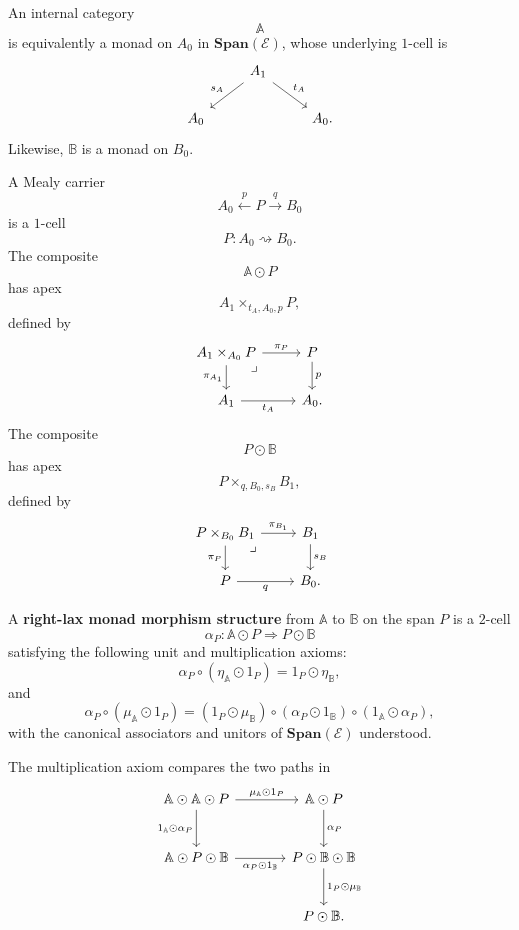 An internal category
\[
    \mathbb A
\]
is equivalently a monad on \(A_0\) in \(\mathbf{Span}(\mathcal E)\), whose
underlying \(1\)-cell is
\[
\begin{tikzcd}
    &
    A_1
        \arrow[dl, "s_A"']
        \arrow[dr, "t_A"]
    &
    \\
    A_0
    &&
    A_0.
\end{tikzcd}
\]
Likewise, \(\mathbb B\) is a monad on \(B_0\).

A Mealy carrier
\[
    A_0\xleftarrow{p}P\xrightarrow{q}B_0
\]
is a \(1\)-cell
\[
    P:A_0\rightsquigarrow B_0.
\]
The composite
\[
    \mathbb A\odot P
\]
has apex
\[
    A_1\times_{t_A,A_0,p}P,
\]
defined by
\[
\begin{tikzcd}
    A_1\times_{A_0}P
        \arrow[r, "\pi_P"]
        \arrow[d, "\pi_{A_1}"']
        \arrow[dr, phantom, "\lrcorner", very near start]
    &
    P
        \arrow[d, "p"]
    \\
    A_1
        \arrow[r, "t_A"']
    &
    A_0.
\end{tikzcd}
\]
The composite
\[
    P\odot\mathbb B
\]
has apex
\[
    P\times_{q,B_0,s_B}B_1,
\]
defined by
\[
\begin{tikzcd}
    P\times_{B_0}B_1
        \arrow[r, "\pi_{B_1}"]
        \arrow[d, "\pi_P"']
        \arrow[dr, phantom, "\lrcorner", very near start]
    &
    B_1
        \arrow[d, "s_B"]
    \\
    P
        \arrow[r, "q"']
    &
    B_0.
\end{tikzcd}
\]

\begin{definition}
\label{def:to-right-lax-monad-morphism}
    A \textbf{right-lax monad morphism structure} from \(\mathbb A\) to
    \(\mathbb B\) on the span \(P\) is a \(2\)-cell
    \[
        \alpha_P:
        \mathbb A\odot P
        \Longrightarrow
        P\odot\mathbb B
    \]
    satisfying the following unit and multiplication axioms:
    \[
        \alpha_P
        \circ
        (\eta_{\mathbb A}\odot1_P)
        =
        1_P\odot\eta_{\mathbb B},
    \]
    and
    \[
        \alpha_P
        \circ
        (\mu_{\mathbb A}\odot1_P)
        =
        (1_P\odot\mu_{\mathbb B})
        \circ
        (\alpha_P\odot1_{\mathbb B})
        \circ
        (1_{\mathbb A}\odot\alpha_P),
    \]
    with the canonical associators and unitors of
    \(\mathbf{Span}(\mathcal E)\) understood.
\end{definition}

The multiplication axiom compares the two paths in
\[
\begin{tikzcd}[column sep=large, row sep=large]
    \mathbb A\odot\mathbb A\odot P
        \arrow[r, "\mu_{\mathbb A}\odot1_P"]
        \arrow[d, "1_{\mathbb A}\odot\alpha_P"']
    &
    \mathbb A\odot P
        \arrow[d, "\alpha_P"]
    \\
    \mathbb A\odot P\odot\mathbb B
        \arrow[r, "\alpha_P\odot1_{\mathbb B}"']
    &
    P\odot\mathbb B\odot\mathbb B
        \arrow[d, "1_P\odot\mu_{\mathbb B}"]
    \\
    &
    P\odot\mathbb B.
\end{tikzcd}
\]

